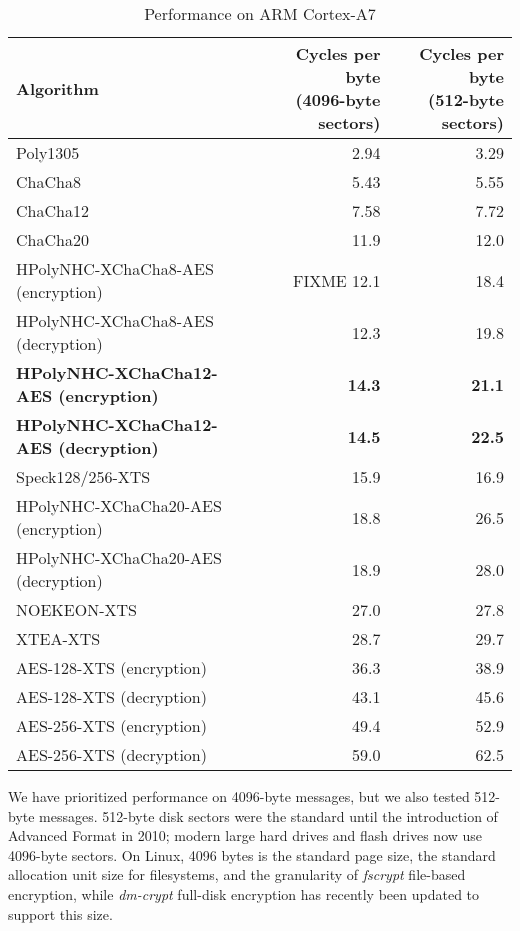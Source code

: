 \documentclass[journal=tosc,preprint,floatrow,submission]{iacrtrans}
\begin{document}
\begin{table}
    \caption{Performance on ARM Cortex-A7}
    \label{performance}
    \centering
    \begin{tabular}{lrr}
        Algorithm &
            \makecell{Cycles per byte \\ (4096-byte sectors)} &
            \makecell{Cycles per byte \\ (512-byte sectors)} \\
    \hline
    Poly1305                              & 2.94 & 3.29 \\
    ChaCha8                               & 5.43 & 5.55 \\
    ChaCha12                              & 7.58 & 7.72 \\
    ChaCha20                              & 11.9 & 12.0 \\
    HPolyNHC-XChaCha8-AES (encryption)      & FIXME 12.1 & 18.4 \\
    HPolyNHC-XChaCha8-AES (decryption)      & 12.3 & 19.8 \\
    \textbf{HPolyNHC-XChaCha12-AES (encryption)} & \textbf{14.3} & \textbf{21.1} \\
    \textbf{HPolyNHC-XChaCha12-AES (decryption)} & \textbf{14.5} & \textbf{22.5} \\
    Speck128/256-XTS                      & 15.9 & 16.9 \\
    HPolyNHC-XChaCha20-AES (encryption)     & 18.8 & 26.5 \\
    HPolyNHC-XChaCha20-AES (decryption)     & 18.9 & 28.0 \\
    NOEKEON-XTS                           & 27.0 & 27.8 \\
    XTEA-XTS                              & 28.7 & 29.7 \\
    AES-128-XTS (encryption)              & 36.3 & 38.9 \\
    AES-128-XTS (decryption)              & 43.1 & 45.6 \\
    AES-256-XTS (encryption)              & 49.4 & 52.9 \\
    AES-256-XTS (decryption)              & 59.0 & 62.5 \\
    \end{tabular}
\end{table}

We have prioritized performance on 4096-byte messages, but we also tested 512-byte messages.
512-byte disk sectors were the standard until the introduction of Advanced Format in 2010;
modern large hard drives and flash drives now use 4096-byte sectors.
On Linux, 4096 bytes is the standard page size, the standard allocation unit size for filesystems,
and the granularity of \textit{fscrypt} file-based encryption, while
\mbox{\textit{dm-crypt}} full-disk encryption has recently been updated
to support this size.
\end{document}
